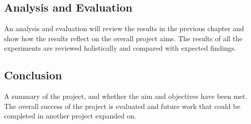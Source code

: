 \subsection*{Analysis and Evaluation}
An analysis and evaluation will review the results in the previous chapter and
show how the results reflect on the overall project aims. The results of all the
experiments are reviewed holistically and compared with expected findings.
\subsection*{Conclusion}
A summary of the project, and whether the aim and objectives have been met. The
overall success of the project is evaluated and future work that could be
completed in another project expanded on.